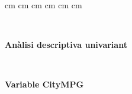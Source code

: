 \pagestyle{plain}
 cm
 cm
 cm
 cm
 cm
 cm

\setlength{\baselineskip}{1.5em}
\setlength{\parskip}{0em}
\setlength{\parsep}{0.5em}
\newcommand{\lge}[1]{\hbox{#1\kern-.1em\raise.5ex\hbox{.}\kern-.1em #1}}
\mbox{ } \vfill
\begin{center} \Large \bf An\`alisi descriptiva univariant \end{center}

\vspace{3ex}
\mbox{ } \vfill
\begin{center} \Large \bf Variable CityMPG \end{center}

